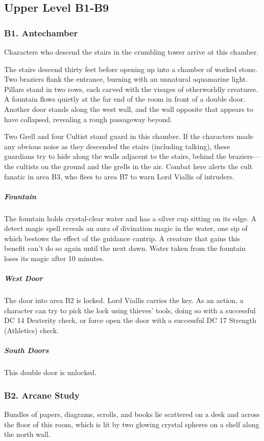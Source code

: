 \documentclass[10pt,a4paper,twoside,bg=print,twocolumn,openany,nodeprecatedcode]{dndbook}
\begin{document}
\subsection{Upper Level B1-B9}
\subsubsection{B1. Antechamber}
Characters who descend the stairs in the crumbling tower arrive at this chamber.

\begin{DndReadAloud}{}
The stairs descend thirty feet before opening up into a chamber of worked stone. Two braziers flank the entrance, burning with an unnatural aquamarine light. Pillars stand in two rows, each carved with the visages of otherworldly creatures. A fountain flows quietly at the far end of the room in front of a double door. Another door stands along the west wall, and the wall opposite that appears to have collapsed, revealing a rough passageway beyond.

\end{DndReadAloud}

Two Grell and four Cultist stand guard in this chamber. If the characters made any obvious noise as they descended the stairs (including talking), these guardians try to hide along the walls adjacent to the stairs, behind the braziers—the cultists on the ground and the grells in the air. Combat here alerts the cult fanatic in area B3, who flees to area B7 to warn Lord Viallis of intruders.

\subparagraph{Fountain}
The fountain holds crystal-clear water and has a silver cup sitting on its edge. A detect magic spell reveals an aura of divination magic in the water, one sip of which bestows the effect of the guidance cantrip. A creature that gains this benefit can't do so again until the next dawn. Water taken from the fountain loses its magic after 10 minutes.

\subparagraph{West Door}
The door into area B2 is locked. Lord Viallis carries the key. As an action, a character can try to pick the lock using thieves' tools, doing so with a successful DC 14 Dexterity check, or force open the door with a successful DC 17 Strength (Athletics) check.

\subparagraph{South Doors}
This double door is unlocked.

\subsubsection{B2. Arcane Study}
\begin{DndReadAloud}{}
Bundles of papers, diagrams, scrolls, and books lie scattered on a desk and across the floor of this room, which is lit by two glowing crystal spheres on a shelf along the north wall.

\end{DndReadAloud}
\end{document}
